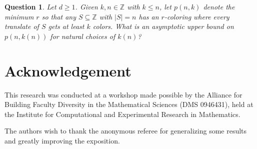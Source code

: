 \documentclass[12pt]{article}
\newcommand{\junk}[1]{}
\newenvironment{proof}{{\bf Proof:  }}{\hfill\rule{2mm}{2mm}}
\newtheorem{proposition}[theorem]{Proposition}
\newtheorem{question}[theorem]{Question}
\newcommand{\Z}{\ensuremath{\mathbb Z}}
\begin{document}
\begin{question}
Let $d \ge 1$. Given $k,n \in \Z$ with $k \le n$, let $p(n,k)$ denote the minimum $r$ so that any $S \subseteq \Z$ with $|S|=n$ has an $r$-coloring where every translate of $S$ gets at least $k$ colors.  What is an asymptotic upper bound on $p(n,k(n))$ for natural choices of $k(n)$? %
\end{question}


\junk{
\begin{proposition}\label{3noncol}
Let $S= \{(0,0), (a, b), (c,d)\} \subseteq \Z^2$.  If the three points in $S$ are not collinear, then $p(S) = 3$.
\end{proposition}

\begin{proof} 3-color the line containing two of the points with a special block coloring.  Then color the parallel line through the third point s.t. $S$ has all three colors. By the properties of the special block coloring, the second line will be colored with a permutation of the coloring of the first line.  Then use these two lines as a template for the rest of the plane.
\end{proof}
}


\section{Acknowledgement}
This research was conducted at a workshop made possible by the Alliance for Building Faculty Diversity in the Mathematical Sciences (DMS 0946431), held at the Institute for Computational and Experimental Research in Mathematics.  

The authors wish to thank the anonymous referee for generalizing some results and greatly improving the exposition.
\end{document}
